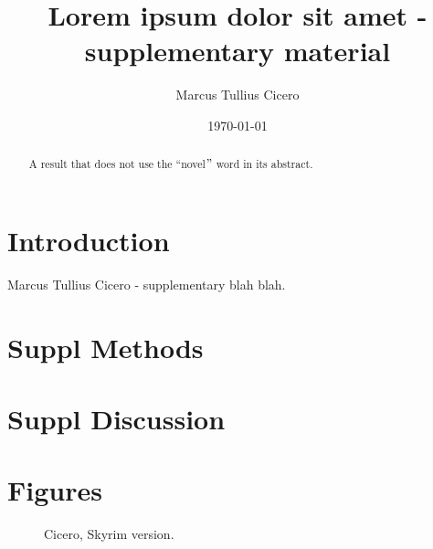 \documentclass[fleqn]{scrartcl}%
\title{Lorem ipsum dolor sit amet - supplementary material}%
\author{Marcus Tullius Cicero}%
\date{\today}%
\begin{document}
    \maketitle
    \begin{abstract}
        A result that does not use the ``novel\("\) word in its abstract.
    \end{abstract}


    \clearpage
    \section*{Introduction}
    Marcus Tullius Cicero  - supplementary blah blah.

    \clearpage
    \section*{Suppl Methods}
    \blindtext




    \clearpage
    \section*{Suppl Discussion}
    \blindtext


    \clearpage
    
    


    \clearpage
    \section*{Figures}

    \begin{figure}[ht]%
        \caption {Cicero, Skyrim\cite{simkins2012unbroken} version.}
        \label{fig:ciceroskyrim} %
    \end{figure}
\end{document}
